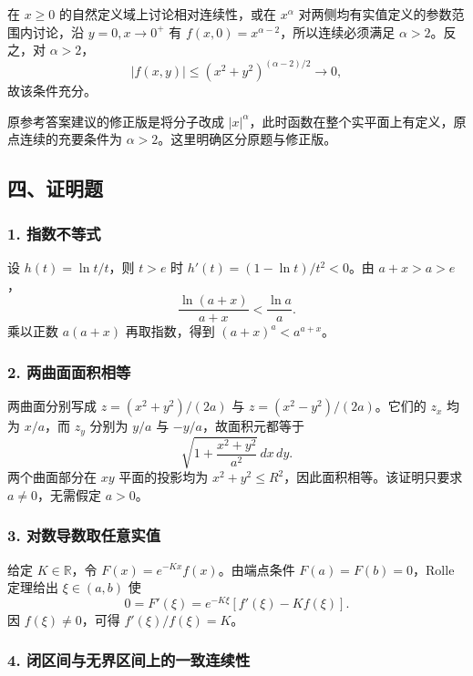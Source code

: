 \documentclass[11pt,fontset=fandol]{ctexart}
\begin{document}
在 \(x\geq0\) 的自然定义域上讨论相对连续性，或在 \(x^\alpha\)
对两侧均有实值定义的参数范围内讨论，沿 \(y=0,x\to0^+\) 有
\(f(x,0)=x^{\alpha-2}\)，所以连续必须满足 \(\alpha>2\)。反之，对
\(\alpha>2\)， \[
|f(x,y)|\leq(x^2+y^2)^{(\alpha-2)/2}\longrightarrow0,
\] 故该条件充分。

原参考答案建议的修正版是将分子改成
\(|x|^\alpha\)，此时函数在整个实平面上有定义，原点连续的充要条件为
\(\boxed{\alpha>2}\)。这里明确区分原题与修正版。

\subsection{四、证明题}\label{ux56dbux8bc1ux660eux9898}

\subsubsection{1. 指数不等式}\label{ux6307ux6570ux4e0dux7b49ux5f0f}

设 \(h(t)=\ln t/t\)，则 \(t>e\) 时 \(h'(t)=(1-\ln t)/t^2<0\)。由
\(a+x>a>e\)， \[
\frac{\ln(a+x)}{a+x}<\frac{\ln a}{a}.
\] 乘以正数 \(a(a+x)\) 再取指数，得到 \((a+x)^a<a^{a+x}\)。

\subsubsection{2.
两曲面面积相等}\label{ux4e24ux66f2ux9762ux9762ux79efux76f8ux7b49}

两曲面分别写成 \(z=(x^2+y^2)/(2a)\) 与 \(z=(x^2-y^2)/(2a)\)。它们的
\(z_x\) 均为 \(x/a\)，而 \(z_y\) 分别为 \(y/a\) 与
\(-y/a\)，故面积元都等于 \[
\sqrt{1+\frac{x^2+y^2}{a^2}}\,dx\,dy.
\] 两个曲面部分在 \(xy\) 平面的投影均为
\(x^2+y^2\leq R^2\)，因此面积相等。该证明只要求 \(a\neq0\)，无需假定
\(a>0\)。

\subsubsection{3.
对数导数取任意实值}\label{ux5bf9ux6570ux5bfcux6570ux53d6ux4efbux610fux5b9eux503c}

给定 \(K\in\mathbb R\)，令 \(F(x)=e^{-Kx}f(x)\)。由端点条件
\(F(a)=F(b)=0\)，Rolle 定理给出 \(\xi\in(a,b)\) 使 \[
0=F'(\xi)=e^{-K\xi}[f'(\xi)-Kf(\xi)].
\] 因 \(f(\xi)\neq0\)，可得 \(f'(\xi)/f(\xi)=K\)。

\subsubsection{4.
闭区间与无界区间上的一致连续性}\label{ux95edux533aux95f4ux4e0eux65e0ux754cux533aux95f4ux4e0aux7684ux4e00ux81f4ux8fdeux7eedux6027}
\end{document}
